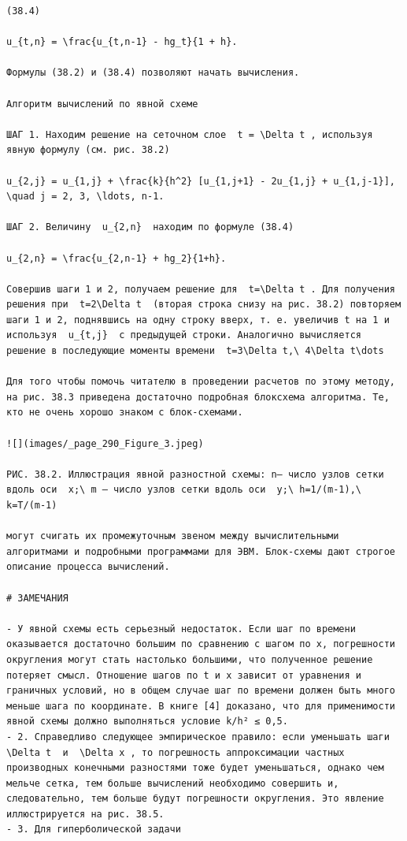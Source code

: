 \documentclass[
  ukrainian,
]{article}
\begin{document}
\begin{verbatim}
(38.4) 

u_{t,n} = \frac{u_{t,n-1} - hg_t}{1 + h}.

Формулы (38.2) и (38.4) позволяют начать вычисления.

Алгоритм вычислений по явной схеме

ШАГ 1. Находим решение на сеточном слое  t = \Delta t , используя явную формулу (см. рис. 38.2)

u_{2,j} = u_{1,j} + \frac{k}{h^2} [u_{1,j+1} - 2u_{1,j} + u_{1,j-1}], \quad j = 2, 3, \ldots, n-1.

ШАГ 2. Величину  u_{2,n}  находим по формуле (38.4)

u_{2,n} = \frac{u_{2,n-1} + hg_2}{1+h}.

Совершив шаги 1 и 2, получаем решение для  t=\Delta t . Для получения решения при  t=2\Delta t  (вторая строка снизу на рис. 38.2) повторяем шаги 1 и 2, поднявшись на одну строку вверх, т. е. увеличив t на 1 и используя  u_{t,j}  с предыдущей строки. Аналогично вычисляется решение в последующие моменты времени  t=3\Delta t,\ 4\Delta t\dots 

Для того чтобы помочь читателю в проведении расчетов по этому методу, на рис. 38.3 приведена достаточно подробная блоксхема алгоритма. Те, кто не очень хорошо знаком с блок-схемами.

![](images/_page_290_Figure_3.jpeg)

РИС. 38.2. Иллюстрация явной разностной схемы: n— число узлов сетки вдоль оси  x;\ m — число узлов сетки вдоль оси  y;\ h=1/(m-1),\ k=T/(m-1) 

могут счигать их промежуточным звеном между вычислительными алгоритмами и подробными программами для ЭВМ. Блок-схемы дают строгое описание процесса вычислений.

# ЗАМЕЧАНИЯ

- У явной схемы есть серьезный недостаток. Если шаг по времени оказывается достаточно большим по сравнению с шагом по х, погрешности округления могут стать настолько большими, что полученное решение потеряет смысл. Отношение шагов по t и х зависит от уравнения и граничных условий, но в общем случае шаг по времени должен быть много меньше шага по координате. В книге [4] доказано, что для применимости явной схемы должно выполняться условие k/h² ≤ 0,5.
- 2. Справедливо следующее эмпирическое правило: если уменьшать шаги  \Delta t  и  \Delta x , то погрешность аппроксимации частных производных конечными разностями тоже будет уменьшаться, однако чем мельче сетка, тем больше вычислений необходимо совершить и, следовательно, тем больше будут погрешности округления. Это явление иллюстрируется на рис. 38.5.
- 3. Для гиперболической задачи


\end{verbatim}
\end{document}
